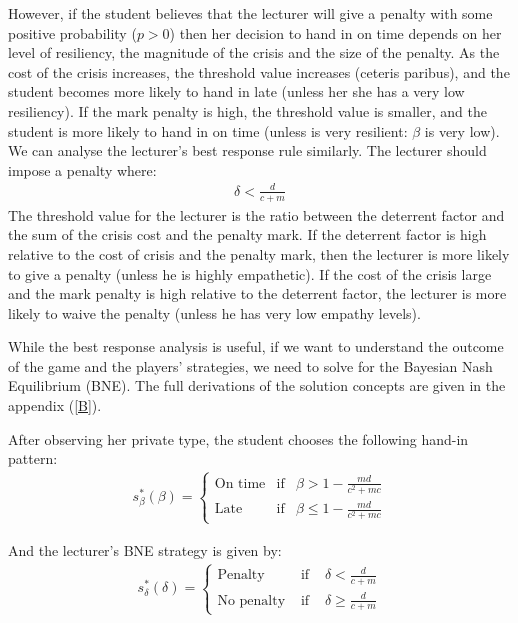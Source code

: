 \documentclass[11pt,preprint, authoryear]{elsarticle}
\numberwithin{equation}{section}
\numberwithin{figure}{section}
\numberwithin{table}{section}
\begin{document}
However, if the student believes that the lecturer will give a penalty
with some positive probability (\(p>0\)) then her decision to hand in on
time depends on her level of resiliency, the magnitude of the crisis and
the size of the penalty. As the cost of the crisis increases, the
threshold value increases (ceteris paribus), and the student becomes
more likely to hand in late (unless her she has a very low resiliency).
If the mark penalty is high, the threshold value is smaller, and the
student is more likely to hand in on time (unless is very resilient:
\(\beta\) is very low). We can analyse the lecturer's best response rule
similarly. The lecturer should impose a penalty where:\\
\begin{align*}
\delta<\frac{d}{c+m}
\end{align*} The threshold value for the lecturer is the ratio between
the deterrent factor and the sum of the crisis cost and the penalty
mark. If the deterrent factor is high relative to the cost of crisis and
the penalty mark, then the lecturer is more likely to give a penalty
(unless he is highly empathetic). If the cost of the crisis large and
the mark penalty is high relative to the deterrent factor, the lecturer
is more likely to waive the penalty (unless he has very low empathy
levels).

While the best response analysis is useful, if we want to understand the
outcome of the game and the players' strategies, we need to solve for
the Bayesian Nash Equilibrium (BNE). The full derivations of the
solution concepts are given in the appendix (\ref{B}).

After observing her private type, the student chooses the following
hand-in pattern:\\
\begin{align*}
s_{\beta}^{*}(\beta)=\left\{\begin{array}{lll}
\text{On time} & \text{if} & \beta>1-\frac{m d}{c^{2}+m c}  \\
\text{Late} & \text{if} & \beta \leq 1-\frac{m d}{c^{2}+m c} 
\end{array}\right.
\end{align*}

And the lecturer's BNE strategy is given by: \begin{align*}
s_{\delta}^{*}(\delta)=\left\{\begin{array}{lll}
\text{Penalty} & \text { if } & \delta<\frac{d}{c+m} \\
\text{No penalty} & \text { if } & \delta \geq \frac{d}{c+m}
\end{array}\right.
\end{align*}
\end{document}
